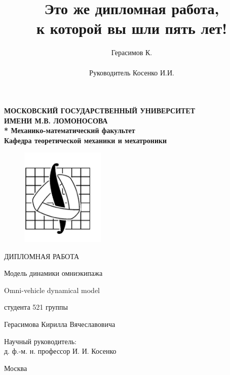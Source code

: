 \documentclass[12pt]{article}
\title{Это же дипломная работа,\\к которой вы шли пять лет!}
\author{Герасимов К.\\ \\Руководитель Косенко И.И.}
\date{} %
\begin{document}
\thispagestyle{empty}
\newpage
\begin{centering}

\textbf{
МОСКОВСКИЙ ГОСУДАРСТВЕННЫЙ УНИВЕРСИТЕТ\\
ИМЕНИ М.В. ЛОМОНОСОВА\\*
Механико-математический факультет\\
Кафедра теоретической механики и мехатроники}

\begin{figure}[h]
\centering
\includegraphics[width=4cm]{mmlogo.png}
\end{figure}
\bigskip
\bigskip

{\Huge ДИПЛОМНАЯ РАБОТА}

\bigskip
\bigskip

{\LARGE Модель динамики омниэкипажа}
\bigskip
\bigskip

{\LARGE Omni-vehicle dynamical model}

\medskip

\bigskip

студента 521 группы\medskip

Герасимова Кирилла Вячеславовича\\
\medskip

\vfill

\begin{flushright}
Научный руководитель: \\
д. ф.-м. н. профессор И. И. Косенко\\



\end{flushright}
\bigskip
\bigskip
\vspace{\fill}
\vspace{\fill}
\vspace{\fill}
\vspace{\fill}

Москва \number\year
\clearpage




\bigskip
\end{centering}
\end{document}
